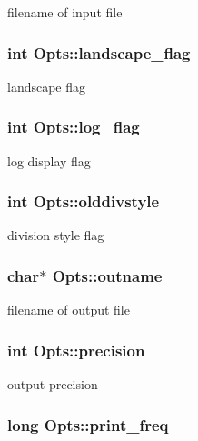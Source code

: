 \label{structOpts_ad99220ebb24e6d311d853d8255a79e13}
filename of input file \hypertarget{structOpts_a3a9551ff976b4180e8ac352f2fc8b869}{
\subsubsection[{landscape\_\-flag}]{\setlength{\rightskip}{0pt plus 5cm}int {\bf Opts::landscape\_\-flag}}}
\label{structOpts_a3a9551ff976b4180e8ac352f2fc8b869}
landscape flag \hypertarget{structOpts_aa63b824d53d3f985907932c8b0b08459}{
\subsubsection[{log\_\-flag}]{\setlength{\rightskip}{0pt plus 5cm}int {\bf Opts::log\_\-flag}}}
\label{structOpts_aa63b824d53d3f985907932c8b0b08459}
log display flag \hypertarget{structOpts_afc63836d11f4dfad0be0cadd2d9f7eb0}{
\subsubsection[{olddivstyle}]{\setlength{\rightskip}{0pt plus 5cm}int {\bf Opts::olddivstyle}}}
\label{structOpts_afc63836d11f4dfad0be0cadd2d9f7eb0}
division style flag \hypertarget{structOpts_a8c98c4d3ed9b5b8755492a5bf86ff7e8}{
\subsubsection[{outname}]{\setlength{\rightskip}{0pt plus 5cm}char$\ast$ {\bf Opts::outname}}}
\label{structOpts_a8c98c4d3ed9b5b8755492a5bf86ff7e8}
filename of output file \hypertarget{structOpts_a0bad34844ab97c5e2b1c5f1d5728d7d1}{
\subsubsection[{precision}]{\setlength{\rightskip}{0pt plus 5cm}int {\bf Opts::precision}}}
\label{structOpts_a0bad34844ab97c5e2b1c5f1d5728d7d1}
output precision \hypertarget{structOpts_aeebb3ff1e19473c5bb4a1b94132e9122}{
\subsubsection[{print\_\-freq}]{\setlength{\rightskip}{0pt plus 5cm}long {\bf Opts::print\_\-freq}}}
